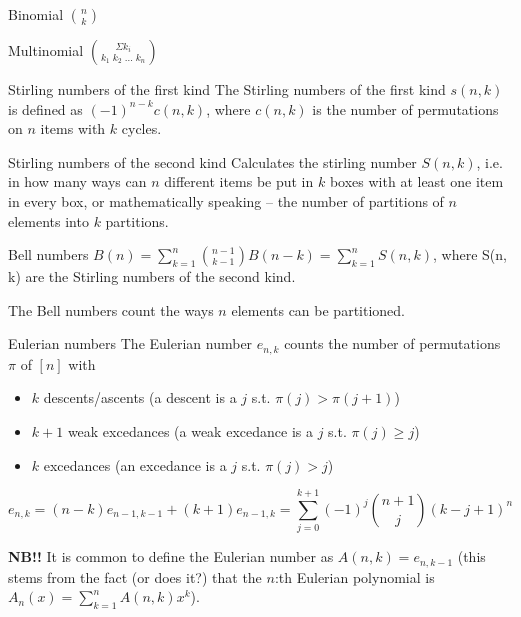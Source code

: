 

\begin{algorithm}{Binomial $\binom{n}{k}$}
\end{algorithm}

\begin{algorithm}{Multinomial $\binom{\Sigma k_i}{k_1\;k_2\;\ldots\;k_n}$}
\end{algorithm}

\begin{algorithm}{Stirling numbers of the first kind}
\desc
The Stirling numbers of the first kind $s(n,k)$ is defined as
$(-1)^{n-k}c(n,k)$, where $c(n,k)$ is the number of permutations on
$n$ items with $k$ cycles.
\end{algorithm}

\begin{algorithm}{Stirling numbers of the second kind}
\desc
Calculates the stirling number $S(n,k)$, i.e. in how many ways can $n$
different items be put in $k$ boxes with at least one item in every
box, or mathematically speaking -- the number of partitions of $n$
elements into $k$ partitions.
\end{algorithm}

\begin{algorithm}{Bell numbers}
\desc
$B(n) = \sum_{k=1}^n \binom{n-1}{k-1} B(n-k) = \sum_{k=1}^n S(n,k)$,
where S(n, k) are the Stirling numbers of the second kind.

The Bell numbers count the ways $n$ elements can be partitioned.
\end{algorithm}

\begin{algorithm}{Eulerian numbers}
\desc
The Eulerian number $e_{n,k}$ counts the number of permutations $\pi$
of $[n]$ with
\begin{itemize}
\item $k$ descents/ascents (a descent is a $j$ s.t. $\pi(j) > \pi(j+1)$)
\item $k+1$ weak excedances (a weak excedance is a $j$ s.t. $\pi(j) \ge j$)
\item $k$ excedances (an excedance is a $j$ s.t. $\pi(j) > j$)
\end{itemize}
$$e_{n,k} = (n-k)e_{n-1,k-1} + (k+1) e_{n-1, k} = \sum_{j=0}^{k+1}
(-1)^j \binom{n+1}{j} (k - j + 1)^n$$

{\bf NB!!} It is common to define the Eulerian number as $A(n,k) =
e_{n,k-1}$ (this stems from the fact (or does it?) that the $n$:th
Eulerian polynomial is $A_n(x) = \sum_{k=1}^{n} A(n,k)x^k$).
\end{algorithm}

